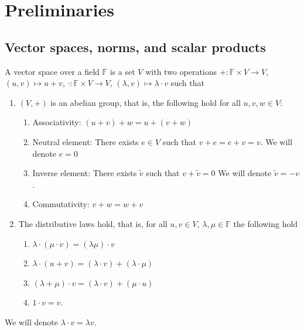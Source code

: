 \chapter{Preliminaries}

\section{Vector spaces, norms, and scalar products}
\begin{defn}\label{preliminaries:defn:vectorspace}
    A vector space over a field $\mathbb{F}$ is a set $V$ with two operations $+:\mathbb{F}\times V\rightarrow V$, $(u,v)\mapsto u+v$, $\cdot:\mathbb{F}\times V\rightarrow V$, $(\lambda,v)\mapsto\lambda \cdot v$ such that
    \begin{enumerate}
        \item $(V,+)$ is an abelian group, that is, the following hold for all $u,v,w\in V$:
        \begin{enumerate}
            \item Associativity: $(u+v)+w = u+(v+w)$
            \item Neutral element: There exists $e\in V$ such that $v+e = e+v = v$. We will denote $e=0$
            \item Inverse element: There exists $\tilde{v}$ such that $v+\tilde{v}=0$ We will denote $\tilde{v} = -v$.
            \item Commutativity: $v+w=w+v$
        \end{enumerate}
        \item The distributive laws hold, that is, for all $u,v\in V$, $\lambda, \mu\in \mathbb{F}$ the following hold
        \begin{enumerate}
            \item $\lambda\cdot(\mu\cdot v) = (\lambda\mu)\cdot v$
            \item $\lambda\cdot(u+v) = (\lambda\cdot v) + (\lambda\cdot\mu)$
            \item $(\lambda+\mu)\cdot v = (\lambda\cdot v) + (\mu\cdot u)$
            \item $1\cdot v = v$.
        \end{enumerate}
    \end{enumerate}
    We will denote $\lambda\cdot v = \lambda v$.
\end{defn}

